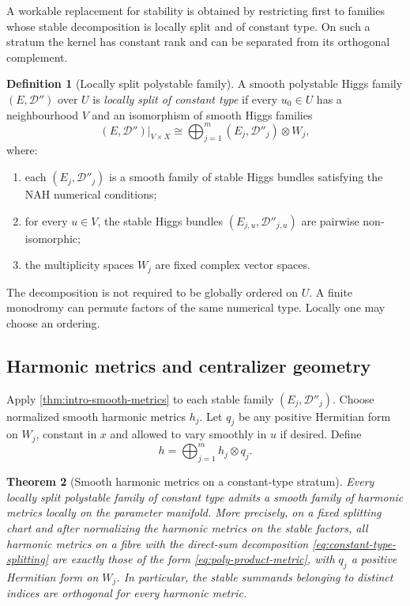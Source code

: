 \documentclass[11pt,reqno]{amsart}
\newtheorem{theorem}{Theorem}[section]
\theoremstyle{definition}
\newtheorem{definition}[theorem]{Definition}
\theoremstyle{remark}
\newcommand{\cD}{\mathcal D}
\begin{document}
A workable replacement for stability is obtained by restricting first to families whose stable decomposition is locally split and of constant type.  On such a stratum the kernel has constant rank and can be separated from its orthogonal complement.


\begin{definition}[Locally split polystable family]\label{def:locally-split-poly}
A smooth polystable Higgs family $(E,\cD'')$ over $U$ is \emph{locally split of constant type} if every $u_0\in U$ has a neighbourhood $V$ and an isomorphism of smooth Higgs families
\begin{equation}\label{eq:constant-type-splitting}
  (E,\cD'')|_{V\times X}
  \cong
  \bigoplus_{j=1}^m(E_j,\cD''_j)\otimes W_j,
\end{equation}
where:
\begin{enumerate}[label=(\roman*)]
\item each $(E_j,\cD''_j)$ is a smooth family of stable Higgs bundles satisfying the NAH numerical conditions;
\item for every $u\in V$, the stable Higgs bundles $(E_{j,u},\cD''_{j,u})$ are pairwise non-isomorphic;
\item the multiplicity spaces $W_j$ are fixed complex vector spaces.
\end{enumerate}
\end{definition}

The decomposition is not required to be globally ordered on $U$.  A finite monodromy can permute factors of the same numerical type.  Locally one may choose an ordering.

\subsection{Harmonic metrics and centralizer geometry}

Apply \cref{thm:intro-smooth-metrics} to each stable family $(E_j,\cD''_j)$.  Choose normalized smooth harmonic metrics $h_j$.  Let $q_j$ be any positive Hermitian form on $W_j$, constant in $x$ and allowed to vary smoothly in $u$ if desired.  Define
\begin{equation}\label{eq:poly-product-metric}
  h=\bigoplus_{j=1}^m h_j\otimes q_j.
\end{equation}

\begin{theorem}[Smooth harmonic metrics on a constant-type stratum]\label{thm:constant-type}
Every locally split polystable family of constant type admits a smooth family of harmonic metrics locally on the parameter manifold.  More precisely, on a fixed splitting chart and after normalizing the harmonic metrics on the stable factors, all harmonic metrics on a fibre with the direct-sum decomposition \eqref{eq:constant-type-splitting} are exactly those of the form \eqref{eq:poly-product-metric}, with $q_j$ a positive Hermitian form on $W_j$.  In particular, the stable summands belonging to distinct indices are orthogonal for every harmonic metric.
\end{theorem}
\end{document}
